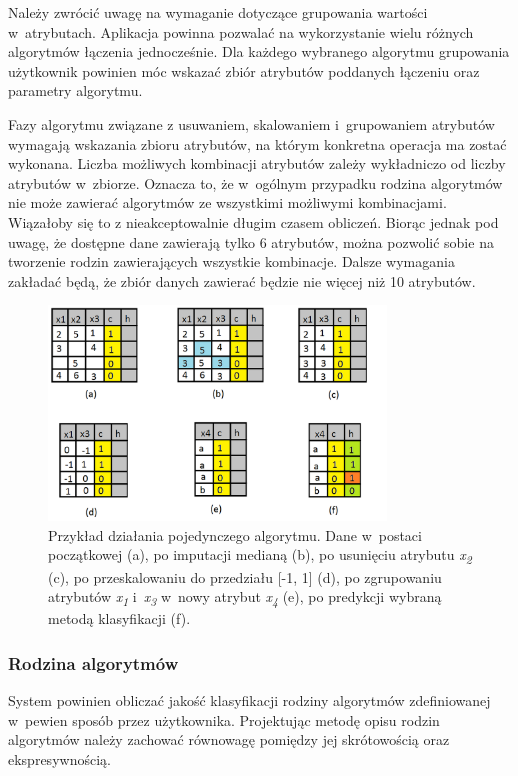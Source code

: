 \documentclass[../thesis.tex]{subfiles}
\begin{document}
Należy zwrócić uwagę na wymaganie dotyczące grupowania wartości w~atrybutach. Aplikacja powinna pozwalać na wykorzystanie wielu różnych algorytmów łączenia jednocześnie. Dla każdego wybranego algorytmu grupowania użytkownik powinien móc wskazać zbiór atrybutów poddanych łączeniu oraz parametry algorytmu.

Fazy algorytmu związane z usuwaniem, skalowaniem i~grupowaniem atrybutów wymagają wskazania zbioru atrybutów, na którym konkretna operacja ma zostać wykonana. Liczba możliwych kombinacji atrybutów zależy wykładniczo od liczby atrybutów w~zbiorze. Oznacza to, że w~ogólnym przypadku rodzina algorytmów nie może zawierać algorytmów ze wszystkimi możliwymi kombinacjami. Wiązałoby się to z nieakceptowalnie długim czasem obliczeń. Biorąc jednak pod uwagę, że dostępne dane zawierają tylko 6 atrybutów, można pozwolić sobie na tworzenie rodzin zawierających wszystkie kombinacje. Dalsze wymagania zakładać będą, że zbiór danych zawierać będzie nie więcej niż 10 atrybutów.

\begin{figure}[h]
\centering
\includegraphics[width=0.8\textwidth]{algorithm.png}
\caption{Przykład działania pojedynczego algorytmu. Dane w~postaci początkowej (a), po imputacji medianą (b), po usunięciu atrybutu \textit{x\textsubscript{2}} (c), po przeskalowaniu do przedziału [-1, 1] (d), po zgrupowaniu atrybutów \textit{x\textsubscript{1}} i~\textit{x\textsubscript{3}} w~nowy atrybut \textit{x\textsubscript{4}} (e), po predykcji wybraną metodą klasyfikacji (f).}
\label{req:algorithm}
\end{figure}

\subsubsection{Rodzina algorytmów}

System powinien obliczać jakość klasyfikacji rodziny algorytmów zdefiniowanej w~pewien sposób przez użytkownika. Projektując metodę opisu rodzin algorytmów należy zachować równowagę pomiędzy jej skrótowością oraz ekspresywnością. 
\end{document}

